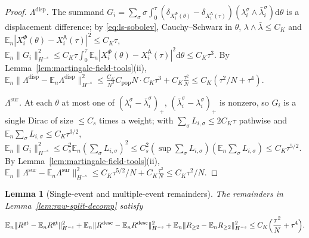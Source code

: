 \documentclass[a4paper,fleqn]{cas-sc}
\newtheorem{lemma}[theorem]{Lemma}
\theoremstyle{definition}
\theoremstyle{remark}
\begin{document}
\begin{proof}
\emph{$\Lambda^{\mathrm{disp}}$.} The summand $G_i=\sum_\sigma\sigma\int_0^\tau(\delta_{X^\Phi_i(\theta)}-\delta_{X^{\mathsf A}_i(\tau)})(\lambda^\sigma_i\wedge\bar\lambda^\sigma_i)\mathrm d\theta$
is a displacement difference; by \eqref{eq:ls-sobolev}, Cauchy--Schwarz in $\theta$,
$\lambda\wedge\bar\lambda\le C_K$ and $\mathbb E_n|X^\Phi_i(\theta)-X^{\mathsf A}_i(\tau)|^2\le C_K\tau$,
$\mathbb E_n\|G_i\|_{H^{-s}}^2\le C_K\tau\int_0^\tau\mathbb E_n|X^\Phi_i(\theta)-X^{\mathsf A}_i(\tau)|^2\mathrm d\theta\le C_K\tau^3$.
By Lemma~\ref{lem:martingale-field-tools}(ii),
$\mathbb E_n\|\Lambda^{\mathrm{disp}}-\mathbb E_n\Lambda^{\mathrm{disp}}\|_{H^{-s}}^2\le\frac{C_K}{N^2}C_{\mathrm{pop}}N\cdot C_K\tau^3+C_K\frac{\tau^2}N\le C_K(\tau^2/N+\tau^4)$.

\emph{$\Lambda^{\mathrm{sur}}$.} At each $\theta$ at most one of $(\lambda^\sigma_i-\bar\lambda^\sigma_i)_+$,
$(\bar\lambda^\sigma_i-\lambda^\sigma_i)_+$ is nonzero, so $G_i$ is a single Dirac of size
$\le C_s$ times a weight; with $\sum_\sigma L_{i,\sigma}\le 2C_K\tau$ pathwise and
$\mathbb E_n\sum_\sigma L_{i,\sigma}\le C_K\tau^{3/2}$,
$\mathbb E_n\|G_i\|_{H^{-s}}^2\le C_s^2\mathbb E_n(\sum_\sigma L_{i,\sigma})^2\le C_s^2(\sup\textstyle\sum_\sigma L_{i,\sigma})(\mathbb E_n\sum_\sigma L_{i,\sigma})\le C_K\tau^{5/2}$.
By Lemma~\ref{lem:martingale-field-tools}(ii),
$\mathbb E_n\|\Lambda^{\mathrm{sur}}-\mathbb E_n\Lambda^{\mathrm{sur}}\|_{H^{-s}}^2\le C_K\tau^{5/2}/N+C_K\frac{\tau^2}N\le C_K\tau^2/N$.
\end{proof}

\begin{lemma}[Single-event and multiple-event remainders]\label{lem:split-remainders}
The remainders in Lemma~\ref{lem:raw-split-decomp} satisfy
\begin{equation}\label{eq:remainder-bounds}
\mathbb E_n\|R^{\mathrm{gt}}-\mathbb E_nR^{\mathrm{gt}}\|_{H^{-s}}^2
+\mathbb E_n\|R^{\mathrm{desc}}-\mathbb E_nR^{\mathrm{desc}}\|_{H^{-s}}^2
+\mathbb E_n\|R_{\ge2}-\mathbb E_nR_{\ge2}\|_{H^{-s}}^2
\le C_K\Bigl(\frac{\tau^2}{N}+\tau^4\Bigr).
\end{equation}
\end{lemma}
\end{document}
